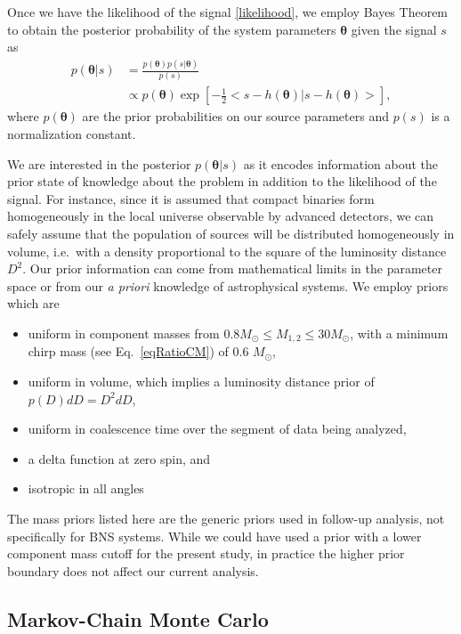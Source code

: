 \documentclass[11pt,a4paper]{emulateapj} 
\newcommand{\thpara}{\boldsymbol{\theta}}
\begin{document}
Once we have the likelihood of the signal \eqref{likelihood}, we
employ Bayes Theorem to obtain the posterior probability of the system
parameters $\thpara$ given the signal $s$ as
\begin{align}
  p(\thpara | s) &= \frac{p(\thpara)p(s | \thpara)}{p(s)}
  \nonumber\\ & \propto p(\thpara) \exp\left[-\frac{1}{2}\big < s -
    h(\thpara) | s-h(\thpara) \big > \right] ,
  \label{posterior}
\end{align}
where $p(\thpara)$ are the prior probabilities on our source
parameters and $p(s)$ is a normalization constant.

We are interested in the posterior $p(\thpara | s)$ as it encodes
information about the prior state of knowledge about the problem in
addition to the likelihood of the signal.  For instance, since it is
assumed that compact binaries form homogeneously in the local universe
observable by advanced detectors, we can safely assume that the
population of sources will be distributed homogeneously in volume, i.e.\
with a density proportional to the square of the luminosity distance $D^2$.  
Our prior information can come from mathematical limits in the parameter space 
or from our \textit{a priori} knowledge of astrophysical systems.  
We employ priors which are
\begin{itemize}
\item uniform in component masses from $0.8M_{\odot} \leq M_{1,2} \leq
  30M_{\odot}$, with a minimum chirp mass (see Eq.~\eqref{eqRatioCM})
  of 0.6 $M_{\odot}$,
\item uniform in volume, which implies a luminosity distance prior of
  $p(D)dD = D^2 dD$,
\item uniform in coalescence time over the segment of data being
  analyzed,
  \item a delta function at zero spin, and
\item isotropic in all angles
\end{itemize}
The mass priors listed here are the generic priors used in follow-up
analysis, not specifically for BNS systems.  While we could have used
a prior with a lower component mass cutoff for the present study, in
practice the higher prior boundary does not affect our current
analysis.


  
\subsection{Markov-Chain Monte Carlo}
\label{MCMCSection}
  
\end{document}
